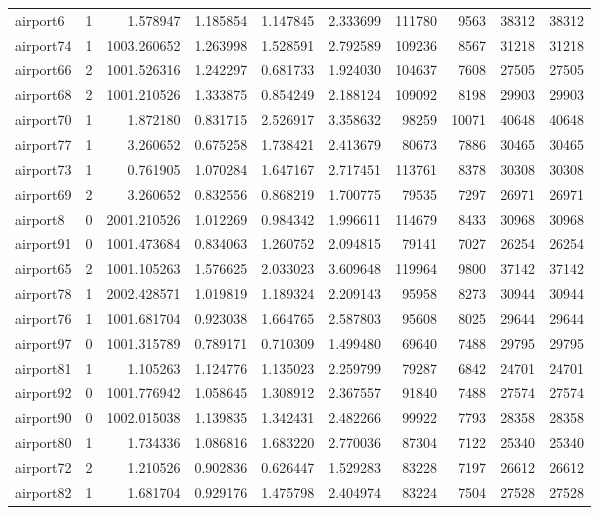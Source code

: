 \begin{longtable}{|l|r|r|r|r|r|r|r|r|r|}
airport6 & 1 & 1.578947 & 1.185854 & 1.147845 & 2.333699 & 111780 & 9563 & 38312 & 38312 \\
airport74 & 1 & 1003.260652 & 1.263998 & 1.528591 & 2.792589 & 109236 & 8567 & 31218 & 31218 \\
airport66 & 2 & 1001.526316 & 1.242297 & 0.681733 & 1.924030 & 104637 & 7608 & 27505 & 27505 \\
airport68 & 2 & 1001.210526 & 1.333875 & 0.854249 & 2.188124 & 109092 & 8198 & 29903 & 29903 \\
airport70 & 1 & 1.872180 & 0.831715 & 2.526917 & 3.358632 & 98259 & 10071 & 40648 & 40648 \\
airport77 & 1 & 3.260652 & 0.675258 & 1.738421 & 2.413679 & 80673 & 7886 & 30465 & 30465 \\
airport73 & 1 & 0.761905 & 1.070284 & 1.647167 & 2.717451 & 113761 & 8378 & 30308 & 30308 \\
airport69 & 2 & 3.260652 & 0.832556 & 0.868219 & 1.700775 & 79535 & 7297 & 26971 & 26971 \\
airport8 & 0 & 2001.210526 & 1.012269 & 0.984342 & 1.996611 & 114679 & 8433 & 30968 & 30968 \\
airport91 & 0 & 1001.473684 & 0.834063 & 1.260752 & 2.094815 & 79141 & 7027 & 26254 & 26254 \\
airport65 & 2 & 1001.105263 & 1.576625 & 2.033023 & 3.609648 & 119964 & 9800 & 37142 & 37142 \\
airport78 & 1 & 2002.428571 & 1.019819 & 1.189324 & 2.209143 & 95958 & 8273 & 30944 & 30944 \\
airport76 & 1 & 1001.681704 & 0.923038 & 1.664765 & 2.587803 & 95608 & 8025 & 29644 & 29644 \\
airport97 & 0 & 1001.315789 & 0.789171 & 0.710309 & 1.499480 & 69640 & 7488 & 29795 & 29795 \\
airport81 & 1 & 1.105263 & 1.124776 & 1.135023 & 2.259799 & 79287 & 6842 & 24701 & 24701 \\
airport92 & 0 & 1001.776942 & 1.058645 & 1.308912 & 2.367557 & 91840 & 7488 & 27574 & 27574 \\
airport90 & 0 & 1002.015038 & 1.139835 & 1.342431 & 2.482266 & 99922 & 7793 & 28358 & 28358 \\
airport80 & 1 & 1.734336 & 1.086816 & 1.683220 & 2.770036 & 87304 & 7122 & 25340 & 25340 \\
airport72 & 2 & 1.210526 & 0.902836 & 0.626447 & 1.529283 & 83228 & 7197 & 26612 & 26612 \\
airport82 & 1 & 1.681704 & 0.929176 & 1.475798 & 2.404974 & 83224 & 7504 & 27528 & 27528 \\

\end{longtable}
